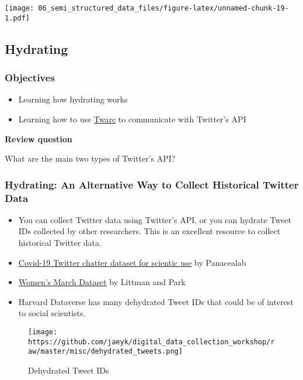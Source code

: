 \documentclass[
]{book}
\providecommand{\tightlist}{%
  \setlength{\itemsep}{0pt}\setlength{\parskip}{0pt}}
\begin{document}
\texttt{[image: 06\_semi\_structured\_data\_files/figure-latex/unnamed-chunk-19-1.pdf]}

\hypertarget{hydrating}{%
\subsection{Hydrating}\label{hydrating}}

\hypertarget{objectives-5}{%
\subsubsection{Objectives}\label{objectives-5}}

\begin{itemize}
\tightlist
\item
  Learning how hydrating works
\item
  Learning how to use \href{https://github.com/DocNow/twarc}{Twarc} to communicate with Twitter's API
\end{itemize}

\textbf{Review question}

What are the main two types of Twitter's API?

\hypertarget{hydrating-an-alternative-way-to-collect-historical-twitter-data}{%
\subsubsection{Hydrating: An Alternative Way to Collect Historical Twitter Data}\label{hydrating-an-alternative-way-to-collect-historical-twitter-data}}

\begin{itemize}
\item
  You can collect Twitter data using Twitter's API, or you can hydrate Tweet IDs collected by other researchers. This is an excellent resource to collect historical Twitter data.
\item
  \href{http://www.panacealab.org/covid19/}{Covid-19 Twitter chatter dataset for scientic use} by Panacealab
\item
  \href{https://dataverse.harvard.edu/dataset.xhtml?persistentId=doi:10.7910/DVN/5ZVMOR}{Women's March Dataset} by Littman and Park
\item
  Harvard Dataverse has many dehydrated Tweet IDs that could be of interest to social scientists.
\end{itemize}

\begin{figure}
\centering
\texttt{[image: https://github.com/jaeyk/digital\_data\_collection\_workshop/raw/master/misc/dehydrated\_tweets.png]}
\caption{Dehydrated Tweet IDs}
\end{figure}
\end{document}
